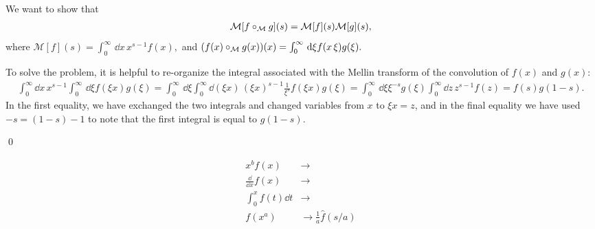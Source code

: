 

We want to show that
\begin{align*}
    \mathcal{M}[f \circ_{\mathcal{M}} g](s) = \mathcal{M}[f](s) \mathcal{M}[g](s)
    ,
\end{align*}
where
\(
    \mathcal{M}[f](s) = \int_0^\infty \,\dd x\, x^{s-1} f(x)
    ,
\)
and
\(
    (f(x) \circ_{\mathcal{M}} g(x))(x)
    =
    \int_0^\infty\,\dd\xi f(x\,\xi) g(\xi)
    .
\)


To solve the problem, it is helpful to re-organize the integral associated with the Mellin transform of the convolution of \(f(x)\) and \(g(x)\):
\begin{align*}
    \int_0^\infty \dd x\, x^{s-1}
    \int_0^\infty \, \dd \xi
    f(\xi x) g(\xi)
    =
    \int_0^\infty \, \dd \xi
    \int_0^\infty \dd (\xi x)\, (\xi x)^{s-1}
    \frac{1}{\xi^s}
    f(\xi x) g(\xi)
    =
    \int_0^\infty \, \dd \xi
    \xi^{-s}
    g(\xi)
    \int_0^\infty \dd z\, z^{s-1}
    f(z)
    =
    f(s) g(1-s)
    .
\end{align*}
In the first equality, we have exchanged the two integrals and changed variables from \(x\) to \(\xi x = z\), and in the final equality we have used \(-s = (1-s) - 1\) to note that the first integral is equal to \(g(1-s)\).

\qed{}


\begin{align}
    x^b f(x)
    &\to
    \\
    \frac{\dd}{\dd x} f(x)
    &\to
    \\
    \int_0^x f(t) \dd t
    &\to
    \\
    f(x^a)
    &\to
    \frac{1}{a} \hat f(s/a)
\end{align}








